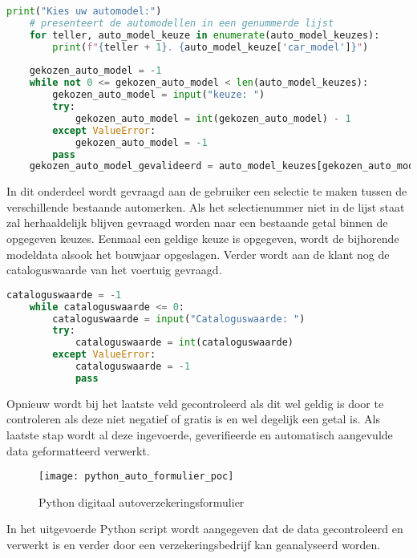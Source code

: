 \begin{lstlisting}[language=Python, caption=Selenium Webdriver vindt automodellen en hun bouwjaar, breaklines=true, showstringspaces=false]
	print("Kies uw automodel:")
	# presenteert de automodellen in een genummerde lijst
	for teller, auto_model_keuze in enumerate(auto_model_keuzes):
		print(f"{teller + 1}. {auto_model_keuze['car_model']}")
	
	gekozen_auto_model = -1
	while not 0 <= gekozen_auto_model < len(auto_model_keuzes):
		gekozen_auto_model = input("keuze: ")
		try:
			gekozen_auto_model = int(gekozen_auto_model) - 1
		except ValueError:
			gekozen_auto_model = -1
		pass
	gekozen_auto_model_gevalideerd = auto_model_keuzes[gekozen_auto_model]
\end{lstlisting}
In dit onderdeel wordt gevraagd aan de gebruiker een selectie te maken tussen de verschillende bestaande automerken. Als het selectienummer niet in de lijst staat zal herhaaldelijk blijven gevraagd worden naar een bestaande getal binnen de opgegeven keuzes. Eenmaal een geldige keuze is opgegeven, wordt de bijhorende modeldata alsook het bouwjaar opgeslagen. 
Verder wordt aan de klant nog de cataloguswaarde van het voertuig gevraagd.
\begin{lstlisting}[language=Python, caption=Python code cataloguswaarde, breaklines=true, showstringspaces=false]
	cataloguswaarde = -1
	while cataloguswaarde <= 0:
		cataloguswaarde = input("Cataloguswaarde: ")
		try:
			cataloguswaarde = int(cataloguswaarde)
		except ValueError:
			cataloguswaarde = -1
			pass
\end{lstlisting}
Opnieuw wordt bij het laatste veld gecontroleerd als dit wel geldig is door te controleren als deze niet negatief of gratis is en wel degelijk een getal is.
Als laatste stap wordt al deze ingevoerde, geverifieerde en automatisch aangevulde data geformatteerd verwerkt.
\begin{figure}[H]
	\centering
	\texttt{[image: python\_auto\_formulier\_poc]}
	\caption{Python digitaal autoverzekeringsformulier}
\end{figure}
In het uitgevoerde Python script wordt aangegeven dat de data gecontroleerd en verwerkt is en verder door een verzekeringsbedrijf kan geanalyseerd worden.


